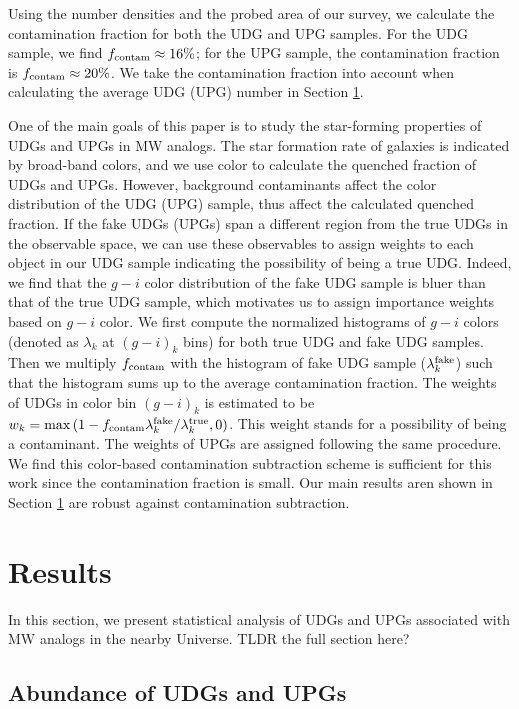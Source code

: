\documentclass[twocolumn,astrosymb,twocolappendix]{aastex631}
\begin{document}
\begin{CJK*}{UTF8}{gbsn}
Using the number densities and the probed area of our survey, we calculate the contamination fraction for both the UDG and UPG samples. For the UDG sample, we find $f_{\rm contam} \approx 16\%$; for the UPG sample, the contamination fraction is $f_{\rm contam} \approx 20\%$. We take the contamination fraction into account when calculating the average UDG (UPG) number in Section \ref{sec:results}. 

One of the main goals of this paper is to study the star-forming properties of UDGs and UPGs in MW analogs. The star formation rate of galaxies is indicated by broad-band colors, and we use color to calculate the quenched fraction of UDGs and UPGs. However, background contaminants affect the color distribution of the UDG (UPG) sample, thus affect the calculated quenched fraction. If the fake UDGs (UPGs) span a different region from the true UDGs in the observable space, we can use these observables to assign weights to each object in our UDG sample indicating the possibility of being a true UDG. Indeed, we find that the $g-i$ color distribution of the fake UDG sample is bluer than that of the true UDG sample, which motivates us to assign importance weights based on $g-i$ color. We first compute the normalized histograms of $g-i$ colors (denoted as $\lambda_k$ at $(g-i)_{k}$ bins) for both true UDG and fake UDG samples. Then we multiply $f_{\rm contam}$ with the histogram of fake UDG sample ($\lambda_k^{\rm fake}$) such that the histogram sums up to the average contamination fraction. The weights of UDGs in color bin $(g-i)_k$ is estimated to be $w_k = \max\,(1 - f_{\rm contam} \lambda_k^{\rm fake} / \lambda_k^{\rm true}, 0)$. This weight stands for a possibility of being a contaminant. The weights of UPGs are assigned following the same procedure. We find this color-based contamination subtraction scheme is sufficient for this work since the contamination fraction is small. Our main results aren shown in Section \ref{sec:results} are robust against contamination subtraction. 


\section{Results}\label{sec:results}
In this section, we present statistical analysis of UDGs and UPGs associated with MW analogs in the nearby Universe. TLDR the full section here?

\subsection{Abundance of UDGs and UPGs}\label{sec:n_udg}


\end{CJK*}
\end{document}
